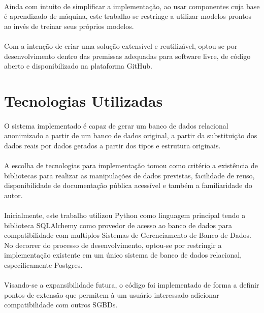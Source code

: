 \paragraph{} Ainda com intuito de simplificar a implementação, ao usar componentes cuja base é aprendizado de máquina, este trabalho se restringe a utilizar modelos prontos ao invés de treinar seus próprios modelos.

\paragraph{} Com a intenção de criar uma solução extensível e reutilizável, optou-se por desenvolvimento dentro das premissas adequadas para software livre, de código aberto e disponibilizado na plataforma GitHub.

\section{Tecnologias Utilizadas}

\paragraph{} O sistema implementado é capaz de gerar um banco de dados relacional anonimizado a partir de um banco de dados original, a partir da substituição dos dados reais por dados gerados a partir dos tipos e estrutura originais.

\paragraph{} A escolha de tecnologias para implementação tomou como critério a existência de bibliotecas para realizar as manipulações de dados previstas, facilidade de reuso, disponibilidade de documentação pública acessível e também a familiaridade do autor.

\paragraph{} Inicialmente, este trabalho utilizou Python como linguagem principal tendo a biblioteca SQLAlchemy como provedor de acesso ao banco de dados para compatibilidade com multiplos Sistemas de Gerenciamento de Banco de Dados. No decorrer do processo de desenvolvimento, optou-se por restringir a implementação existente em um único sistema de banco de dados relacional, especificamente Postgres.

\paragraph{} Visando-se a expansibilidade futura, o código foi implementado de forma a definir pontos de extensão que permitem à um usuário interessado adicionar compatibilidade com outros SGBDs.


